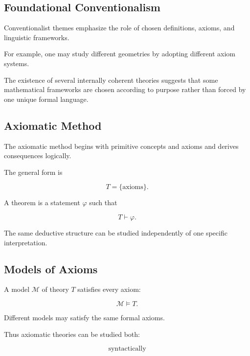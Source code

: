 \subsection{Foundational Conventionalism}
\label{subsec:foundational-conventionalism}

Conventionalist themes emphasize the role of chosen definitions, axioms, and
linguistic frameworks.

For example, one may study different geometries by adopting different axiom
systems.

The existence of several internally coherent theories suggests that some
mathematical frameworks are chosen according to purpose rather than forced
by one unique formal language.

\subsection{Axiomatic Method}
\label{subsec:foundational-axiomatic-method}

The axiomatic method begins with primitive concepts and axioms and derives
consequences logically.

The general form is

\[
\boxed{
T
=
\{\text{axioms}\}.
}
\]

A theorem is a statement \(\varphi\) such that

\[
\boxed{
T\vdash\varphi.
}
\]

The same deductive structure can be studied independently of one specific
interpretation.

\subsection{Models of Axioms}
\label{subsec:models-of-axioms-foundations}

A model \(\mathcal{M}\) of theory \(T\) satisfies every axiom:

\[
\boxed{
\mathcal{M}\models T.
}
\]

Different models may satisfy the same formal axioms.

Thus axiomatic theories can be studied both:

\[
\boxed{
\text{syntactically}
}
\]

